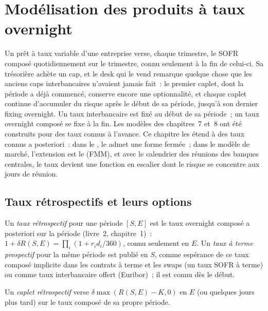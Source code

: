 \chapter{Modélisation des produits à taux overnight}\label{ch:rc:modelling-overnight-rate-products}

Un prêt à taux variable d'une entreprise verse, chaque trimestre, le SOFR composé quotidiennement sur
le trimestre, connu seulement à la fin de celui-ci. Sa trésorière achète un cap, et
le desk qui le vend remarque quelque chose que les anciens caps interbancaires n'avaient jamais fait~: le
premier caplet, dont la période a déjà commencé, conserve encore une optionnalité, et
chaque caplet continue d'accumuler du risque après le début de sa période, jusqu'à son dernier
fixing overnight. Un taux interbancaire est fixé au début de sa période~; un
taux overnight composé se fixe à la fin. Les modèles des chapitres~7 et~8 ont été
construits pour des taux connus à l'avance. Ce chapitre les étend à des taux connus
a posteriori~: dans le , le  admet une
forme fermée~; dans le modèle de marché, l'extension est le  (FMM), et
avec le calendrier des réunions des banques centrales, le taux devient une fonction en escalier
dont le risque se concentre aux jours de réunion.

\section{Taux rétrospectifs et leurs options}

\begin{definition}\label{def:rc:modelling-overnight-rate-products:rates}
Un \emph{taux rétrospectif} pour une période $[S,E]$ est
le taux overnight composé a posteriori sur la période (livre~2,
chapitre~1)~: $1+\delta R(S,E) = \prod_i(1+r_id_i/360)$, connu seulement en $E$. Un
\emph{taux à terme prospectif} pour la même
période est publié en $S$, comme espérance de ce taux composé implicite dans
les contrats à terme et les swaps (un taux SOFR à terme) ou comme taux interbancaire offert (Euribor)~;
il est connu dès le début.
\end{definition}

\begin{definition}\label{def:rc:modelling-overnight-rate-products:caplet}
Un \emph{caplet rétrospectif} verse
$\delta\max(R(S,E)-K,0)$ en $E$ (ou quelques jours plus tard) sur le taux composé de
sa propre période.
\end{definition}

